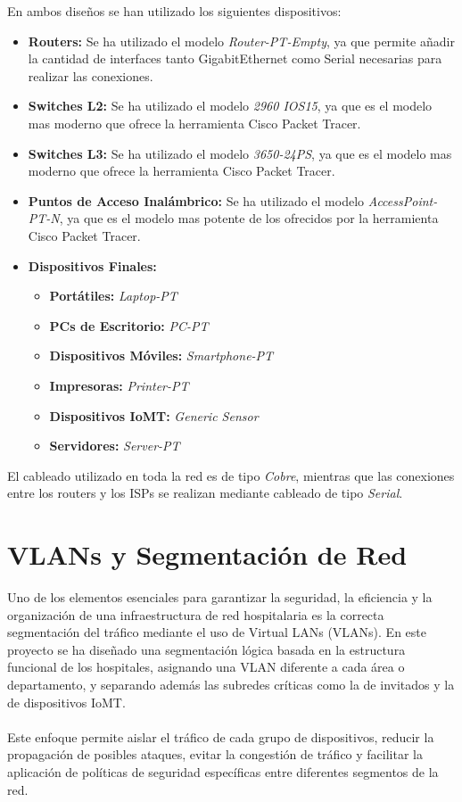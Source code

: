 En ambos diseños se han utilizado los siguientes dispositivos:
\begin{itemize}
    \item \textbf{Routers:} Se ha utilizado el modelo \textit{Router-PT-Empty}, ya que permite añadir la cantidad de interfaces tanto GigabitEthernet como Serial necesarias para realizar 
    las conexiones.
    \item \textbf{Switches L2:} Se ha utilizado el modelo \textit{2960 IOS15}, ya que es el modelo mas moderno que ofrece la herramienta Cisco Packet Tracer.
    \item \textbf{Switches L3:} Se ha utilizado el modelo \textit{3650-24PS}, ya que es el modelo mas moderno que ofrece la herramienta Cisco Packet Tracer.
    \item \textbf{Puntos de Acceso Inalámbrico:} Se ha utilizado el modelo \textit{AccessPoint-PT-N}, ya que es el modelo mas potente de los ofrecidos por la herramienta Cisco Packet Tracer.
    \item \textbf{Dispositivos Finales:} 
    \begin{itemize}
        \item \textbf{Portátiles:} \textit{Laptop-PT}
        \item \textbf{PCs de Escritorio:} \textit{PC-PT}
        \item \textbf{Dispositivos Móviles:} \textit{Smartphone-PT}
        \item \textbf{Impresoras:} \textit{Printer-PT}
        \item \textbf{Dispositivos IoMT:} \textit{Generic Sensor}
        \item \textbf{Servidores:} \textit{Server-PT}
    \end{itemize}
\end{itemize}

El cableado utilizado en toda la red es de tipo \textit{Cobre}, mientras que las conexiones entre los routers y los ISPs se realizan mediante cableado de tipo \textit{Serial}.

\section{VLANs y Segmentación de Red}
Uno de los elementos esenciales para garantizar la seguridad, la eficiencia y la organización de una infraestructura de red hospitalaria es la correcta segmentación del 
tráfico mediante el uso de Virtual LANs (VLANs). En este proyecto se ha diseñado una segmentación lógica basada en la estructura funcional de los hospitales, asignando una 
VLAN diferente a cada área o departamento, y separando además las subredes críticas como la de invitados y la de dispositivos IoMT.
\\ \\
Este enfoque permite aislar el tráfico de cada grupo de dispositivos, reducir la propagación de posibles ataques, evitar la congestión de tráfico y facilitar la aplicación de 
políticas de seguridad específicas entre diferentes segmentos de la red.

